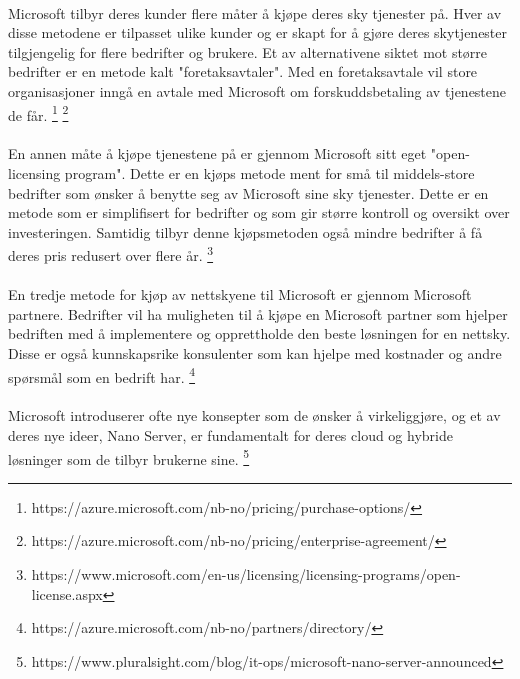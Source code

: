 \paragraph{} Microsoft tilbyr deres kunder flere måter å kjøpe deres sky tjenester på. Hver av disse metodene er tilpasset ulike kunder og er skapt for å gjøre deres skytjenester tilgjengelig for flere bedrifter og brukere. Et av alternativene siktet mot større bedrifter er en metode kalt "foretaksavtaler". Med en foretaksavtale vil store organisasjoner inngå en avtale med Microsoft om forskuddsbetaling av tjenestene de får.
\footnote{https://azure.microsoft.com/nb-no/pricing/purchase-options/}
\footnote{https://azure.microsoft.com/nb-no/pricing/enterprise-agreement/}

\paragraph{} En annen måte å kjøpe tjenestene på er gjennom Microsoft sitt eget "open-licensing program". Dette er en kjøps metode ment for små til middels-store bedrifter som ønsker å benytte seg av Microsoft sine sky tjenester. Dette er en metode som er simplifisert for bedrifter og som gir større kontroll og oversikt over investeringen. Samtidig tilbyr denne kjøpsmetoden også mindre bedrifter å få deres pris redusert over flere år.
\footnote{https://www.microsoft.com/en-us/licensing/licensing-programs/open-license.aspx}

\paragraph{} En tredje metode for kjøp av nettskyene til Microsoft er gjennom Microsoft partnere. Bedrifter vil ha muligheten til å kjøpe en Microsoft partner som hjelper bedriften med å implementere og opprettholde den beste løsningen for en nettsky. Disse er også kunnskapsrike konsulenter som kan hjelpe med kostnader og andre spørsmål som en bedrift har.
\footnote{https://azure.microsoft.com/nb-no/partners/directory/}

\paragraph{} Microsoft introduserer ofte nye konsepter som de ønsker å virkeliggjøre, og et av deres nye ideer, Nano Server, er fundamentalt for deres cloud og hybride løsninger som de tilbyr brukerne sine.
\footnote{https://www.pluralsight.com/blog/it-ops/microsoft-nano-server-announced}

